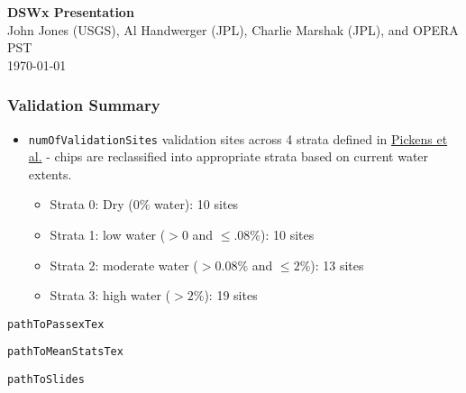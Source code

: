 \documentclass[8pt]{beamer}
\newcommand{\VAR}[1]{\texttt{{#1}}}
\begin{document}
\begin{frame}
\begin{center}
\textbf{DSWx Presentation}\\
\vspace{.5cm}
John Jones (USGS), Al Handwerger (JPL), Charlie Marshak (JPL), and OPERA PST \\

\today\\
\end{center}
\end{frame}


\begin{frame}
\frametitle{Validation Summary}
\tiny
\begin{itemize}
\item \VAR{numOfValidationSites} validation sites across 4 strata defined in \href{https://www.sciencedirect.com/science/article/pii/S0034425720301620}{Pickens et al.} - chips are reclassified into appropriate strata based on current water extents.
\begin{itemize}
\tiny
\item Strata 0: Dry (0$\%$ water): 10 sites
\item Strata 1: low water ($>0$ and $\leq.08\%$): 10 sites
\item Strata 2: moderate  water ($>0.08\%$ and $\leq 2\%$): 13 sites
\item Strata 3: high water ($>2\%$): 19 sites
\end{itemize}
\end{itemize}

\begin{center}

\VAR{pathToPassexTex}

\vspace{.25cm}

\VAR{pathToMeanStatsTex}

\end{center}
\end{frame}

\VAR{pathToSlides}
\end{document}
